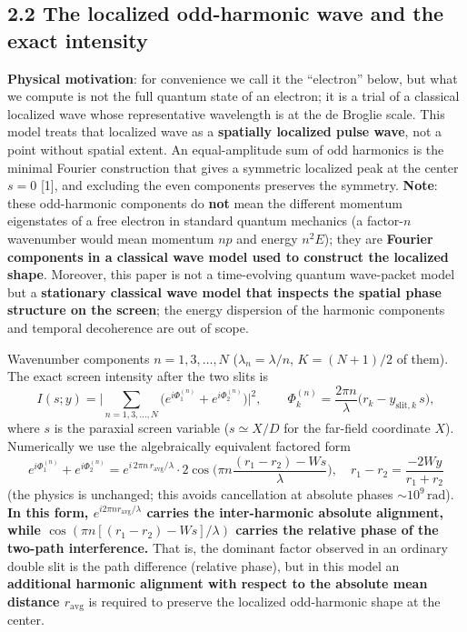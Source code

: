 \documentclass[11pt,a4paper]{article}
\begin{document}
\subsection{2.2 The localized odd-harmonic wave and the exact
intensity}\label{the-localized-odd-harmonic-wave-and-the-exact-intensity}

\textbf{Physical motivation}: for convenience we call it the
``electron'' below, but what we compute is not the full quantum state of
an electron; it is a trial of a classical localized wave whose
representative wavelength is at the de Broglie scale. This model treats
that localized wave as a \textbf{spatially localized pulse wave}, not a
point without spatial extent. An equal-amplitude sum of odd harmonics is
the minimal Fourier construction that gives a symmetric localized peak
at the center \(s=0\) {[}1{]}, and excluding the even components
preserves the symmetry. \textbf{Note}: these odd-harmonic components do
\textbf{not} mean the different momentum eigenstates of a free electron
in standard quantum mechanics (a factor-\(n\) wavenumber would mean
momentum \(np\) and energy \(n^2E\)); they are \textbf{Fourier
components in a classical wave model used to construct the localized
shape}. Moreover, this paper is not a time-evolving quantum wave-packet
model but a \textbf{stationary classical wave model that inspects the
spatial phase structure on the screen}; the energy dispersion of the
harmonic components and temporal decoherence are out of scope.

Wavenumber components \(n=1,3,\dots,N\) (\(\lambda_n=\lambda/n\),
\(K=(N{+}1)/2\) of them). The exact screen intensity after the two slits
is
\[I(s;y)=\Big|\sum_{n=1,3,\dots,N}\big(e^{i\Phi_1^{(n)}}+e^{i\Phi_2^{(n)}}\big)\Big|^2,\qquad
\Phi_k^{(n)}=\frac{2\pi n}{\lambda}\big(r_k-y_{\mathrm{slit},k}\,s\big),\]
where \(s\) is the paraxial screen variable (\(s\simeq X/D\) for the
far-field coordinate \(X\)). Numerically we use the algebraically
equivalent factored form
\[e^{i\Phi_1^{(n)}}+e^{i\Phi_2^{(n)}}=e^{i\,2\pi n\,r_{\mathrm{avg}}/\lambda}\cdot2\cos\!\Big(\pi n\frac{(r_1-r_2)-Ws}{\lambda}\Big),\quad r_1-r_2=\frac{-2Wy}{r_1+r_2}\]
(the physics is unchanged; this avoids cancellation at absolute phases
\(\sim10^9\,\mathrm{rad}\)). \textbf{In this form,
\(e^{i2\pi n r_{\mathrm{avg}}/\lambda}\) carries the inter-harmonic
absolute alignment, while \(\cos(\pi n[(r_1-r_2)-Ws]/\lambda)\) carries
the relative phase of the two-path interference.} That is, the dominant
factor observed in an ordinary double slit is the path difference
(relative phase), but in this model an \textbf{additional harmonic
alignment with respect to the absolute mean distance
\(r_{\mathrm{avg}}\)} is required to preserve the localized odd-harmonic
shape at the center.
\end{document}
